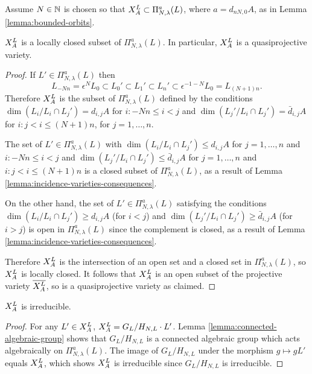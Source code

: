 \documentclass[a4paper, 11pt]{report}
\begin{document}
Assume $N\in\naturals$ is chosen so that $\xprod[L]{A}\subset\Pi_{N,\lambda}^a(L)$, where $a=d_{nN,0}{A}$, as in Lemma \ref{lemma:bounded-orbits}.

\begin{lemma}\label{lemma:orbits-are-quasiprojective}
$\xprod[L]{A}$ is a locally closed subset of $\Pi_{N,\lambda}^a(L)$. In particular, $\xprod[L]{A}$ is a quasiprojective variety.
\end{lemma}

\begin{proof}
If $L'\in\Pi_{N,\lambda}^a(L)$ then
\begin{equation*}
L_{-Nn}=\epsilon^N L_0\subset L_0'\subset L_1'\subset L_n'\subset \epsilon^{-1-N}L_0 = L_{(N+1)n}.
\end{equation*}
Therefore $\xprod[L]{A}$ is the subset of $\Pi_{N,\lambda}^a(L)$ defined by the conditions $\dim(L_i/{L_i\cap L_j'})=d_{i,j}{A}$ for $i:-Nn\le i<j$ and $\dim(L_j'/{L_i\cap L_j'})=\bar{d}_{i,j}{A}$ for $i:j<i\le(N+1)n$, for $j=1,\ldots,n$.

The set of $L'\in\Pi_{N,\lambda}^a(L)$ with $\dim(L_i/{L_i\cap L_j'})\le d_{i,j}{A}$ for $j=1,\ldots,n$ and $i:-Nn\le i<j$ and $\dim(L_j'/{L_i\cap L_j'})\le\bar{d}_{i,j}{A}$ for $j=1,\ldots,n$ and $i:j<i\le(N+1)n$ is a closed subset of $\Pi_{N,\lambda}^a(L)$, as a result of Lemma \ref{lemma:incidence-varieties-consequences}.

On the other hand, the set of $L'\in\Pi_{N,\lambda}^a(L)$ satisfying the conditions $\dim(L_i/{L_i\cap L_j'})\geq d_{i,j}{A}$ (for $i<j$) and $\dim(L_j'/{L_i\cap L_j'})\geq\bar{d}_{i,j}{A}$ (for $i>j$) is open in $\Pi_{N,\lambda}^a(L)$ since the complement is closed, as a result of Lemma \ref{lemma:incidence-varieties-consequences}.

Therefore $\xprod[L]{A}$ is the intersection of an open set and a closed set in $\Pi_{N,\lambda}^a(L)$, so $\xprod[L]{A}$ is locally closed. It follows that $\xprod[L]{A}$ is an open subset of the projective variety $\overline{\xprod[L]{A}}$, so is a quasiprojective variety as claimed.
\end{proof}

\begin{lemma}\label{lemma:orbits-are-irreducible}
$\xprod[L]{A}$ is irreducible.
\end{lemma}

\begin{proof}
For any $L'\in\xprod[L]{A}$, $\xprod[L]{A} = G_L/{H_{N,L}}\cdot L'$. Lemma \ref{lemma:connected-algebraic-group} shows that $G_L/{H_{N,L}}$ is a connected algebraic group which acts algebraically on $\Pi_{N,\lambda}^a(L)$. The image of $G_L/{H_{N,L}}$ under the morphism $g\mapsto gL'$ equals $\xprod[L]{A}$, which shows $\xprod[L]{A}$ is irreducible since $G_L/{H_{N,L}}$ is irreducible.
\end{proof}
\end{document}
